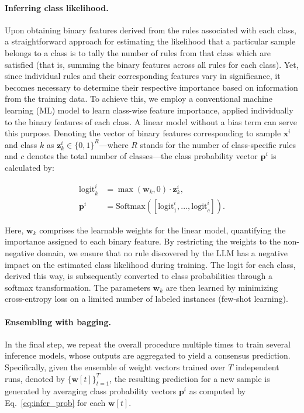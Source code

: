 \paragraph{Inferring class likelihood.} Upon obtaining binary features derived from the rules associated with each class, a straightforward approach for estimating the likelihood that a particular sample belongs to a class is to tally the number of rules from that class which are satisfied (that is, summing the binary features across all rules for each class). Yet, since individual rules and their corresponding features vary in significance, it becomes necessary to determine their respective importance based on information from the training data. To achieve this, we employ a conventional machine learning (ML) model to learn class-wise feature importance, applied individually to the binary features of each class. A linear model without a bias term can serve this purpose. Denoting the vector of binary features corresponding to sample $\mathbf{x}^i$ and class $k$ as $\mathbf{z}_k^i \in \{0, 1\}^R$—where $R$ stands for the number of class-specific rules and $c$ denotes the total number of classes—the class probability vector $\mathbf{p}^i$ is calculated by:

\begin{align}
\text{logit}_k^i &= \max(\mathbf{w}_k, 0) \cdot \mathbf{z}_k^i, \nonumber \\
\mathbf{p}^i &= \text{Softmax}({[\text{logit}_{1}^i, ..., \text{logit}_{c}^i]}). \label{eq:infer_prob}
\end{align}

Here, $\mathbf{w}_k$ comprises the learnable weights for the linear model, quantifying the importance assigned to each binary feature. By restricting the weights to the non-negative domain, we ensure that no rule discovered by the LLM has a negative impact on the estimated class likelihood during training. The logit for each class, derived this way, is subsequently converted to class probabilities through a softmax transformation. The parameters $\mathbf{w}_k$ are then learned by minimizing cross-entropy loss on a limited number of labeled instances (few-shot learning). 

\vspace*{-0.12in}
\paragraph{Ensembling with bagging.} In the final step, we repeat the overall procedure multiple times to train several inference models, whose outputs are aggregated to yield a consensus prediction. Specifically, given the ensemble of weight vectors trained over $T$ independent runs, denoted by $\{\mathbf{w}[t]\}_{t=1}^T$, the resulting prediction for a new sample is generated by averaging class probability vectors $\mathbf{p}^i$ as computed by Eq.~\ref{eq:infer_prob} for each $\mathbf{w}[t]$.

